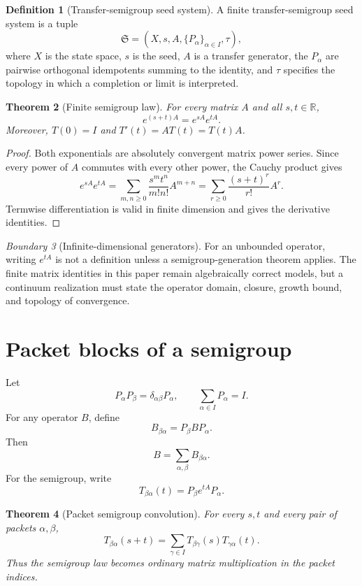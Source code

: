 \documentclass[11pt,a4paper]{article}
\newtheorem{theorem}{Theorem}[section]
\theoremstyle{definition}
\newtheorem{definition}[theorem]{Definition}
\theoremstyle{remark}
\newtheorem{boundary}[theorem]{Boundary}
\newcommand{\bbR}{\mathbb R}
\begin{document}
\begin{definition}[Transfer-semigroup seed system]\label{core:record:001}
A finite transfer-semigroup seed system is a tuple
\[
\mathfrak S=(X,s,A,\{P_\alpha\}_{\alpha\in I},\tau),
\]
where $X$ is the state space, $s$ is the seed, $A$ is a transfer generator, the $P_\alpha$ are pairwise orthogonal idempotents summing to the identity, and $\tau$ specifies the topology in which a completion or limit is interpreted.
\end{definition}

\begin{theorem}[Finite semigroup law]\label{core:record:002}
For every matrix $A$ and all $s,t\in\bbR$,
\[
\boxed{e^{(s+t)A}=e^{sA}e^{tA}.}
\]
Moreover, $T(0)=I$ and $T'(t)=AT(t)=T(t)A$.
\end{theorem}

\begin{proof}
Both exponentials are absolutely convergent matrix power series. Since every power of $A$ commutes with every other power, the Cauchy product gives
\[
e^{sA}e^{tA}
=\sum_{m,n\ge0}\frac{s^mt^n}{m!n!}A^{m+n}
=\sum_{r\ge0}\frac{(s+t)^r}{r!}A^r.
\]
Termwise differentiation is valid in finite dimension and gives the derivative identities.
\end{proof}

\begin{boundary}[Infinite-dimensional generators]\label{core:record:003}
For an unbounded operator, writing $e^{tA}$ is not a definition unless a semigroup-generation theorem applies. The finite matrix identities in this paper remain algebraically correct models, but a continuum realization must state the operator domain, closure, growth bound, and topology of convergence.
\end{boundary}

\section{Packet blocks of a semigroup}\label{core:section:02}

Let
\[
P_\alpha P_\beta=\delta_{\alpha\beta}P_\alpha,
\qquad
\sum_{\alpha\in I}P_\alpha=I.
\]
For any operator $B$, define
\[
B_{\beta\alpha}=P_\beta BP_\alpha.
\]
Then
\[
B=\sum_{\alpha,\beta}B_{\beta\alpha}.
\]
For the semigroup, write
\[
T_{\beta\alpha}(t)=P_\beta e^{tA}P_\alpha.
\]

\begin{theorem}[Packet semigroup convolution]\label{core:record:004}
For every $s,t$ and every pair of packets $\alpha,\beta$,
\[
\boxed{
T_{\beta\alpha}(s+t)
=\sum_{\gamma\in I}T_{\beta\gamma}(s)T_{\gamma\alpha}(t).
}
\]
Thus the semigroup law becomes ordinary matrix multiplication in the packet indices.
\end{theorem}
\end{document}
